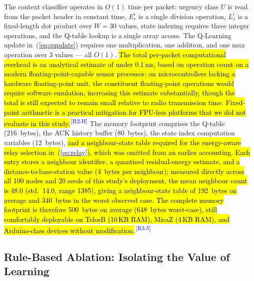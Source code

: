 \documentclass[12pt]{article}
\newcommand{\rtag}[1]{\textsuperscript{\textcolor{blue}{\scriptsize\,[#1]}}}
\newcommand{\hlx}[1]{{\exhyphenpenalty=10000\hyphenpenalty=10000\let\ \nobreakspace\hl{#1}}}
\begin{document}
The context classifier operates in $O(1)$ time per packet: urgency
class $U$ is read from the packet header in constant time, $E_r^i$
is a single division operation, $L_s^i$ is a fixed-length dot product
over $W = 30$ values, state indexing requires three integer
operations, and the Q-table lookup is a single array access. The Q-Learning update in~(\ref{eq:qupdate}) requires one multiplication,
one addition, and one max operation over 3 values --- all $O(1)$.
\hlx{The total per-packet computational overhead is an analytical estimate
of under 0.1\,ms, based on operation count on a modern
floating-point-capable sensor processor; on microcontrollers lacking
a hardware floating-point unit, the constituent floating-point
operations would require software emulation, increasing this
estimate substantially, though the total is still expected to remain
small relative to radio transmission time. Fixed-point arithmetic is
a practical mitigation for FPU-less platforms that we did not
evaluate in this study.}\rtag{R2-H} The memory footprint comprises the Q-table
(216~bytes), the ACK history buffer (80~bytes), the state index
computation variables (12~bytes), \hlx{and a neighbour-state table
required for the energy-aware relay selection in~(}\ref{eq:relay}\hlx{),
which was omitted from an earlier accounting. Each entry stores a
neighbour identifier, a quantised residual-energy estimate, and a
distance-to-base-station value (4~bytes per neighbour); measured
directly across all 100 nodes and 20 seeds of this study's
deployment, the mean neighbour count is 48.0 (std.~14.0, range
13\textendash{}85), giving a neighbour-state table of 192~bytes on average and
340~bytes in the worst observed case. The complete memory footprint
is therefore 500~bytes on average (648~bytes worst-case), still
comfortably deployable on TelosB (10\,KB RAM), MicaZ (4\,KB RAM),
and Arduino-class devices without modification.}\rtag{R3-5}

\subsection{Rule-Based Ablation: Isolating the Value of Learning}
\label{sec:rule_ablation}
\end{document}
